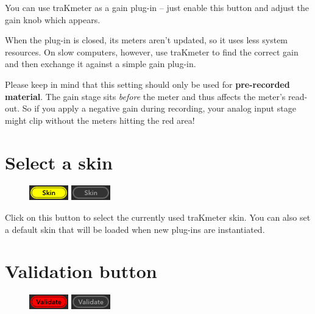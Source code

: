 You can use traKmeter as a gain plug-in -- just enable this button and
adjust the gain knob which appears.

When the plug-in is closed, its meters aren't updated, so it uses less
system resources.  On slow computers, however, use traKmeter to find
the correct gain and then exchange it against a simple gain plug-in.

Please keep in mind that this setting should only be used for
\textbf{pre-recorded material}.  The gain stage sits \emph{before} the
meter and thus affects the meter's read-out.  So if you apply a
negative gain during recording, your analog input stage might clip
without the meters hitting the red area!

\section{Select a skin}

\begin{figure}
\includegraphics[scale=\screenshotscale,clip]{include/images/button_skin_on.png}
\newline \vspace{-0.9\baselineskip}
\includegraphics[scale=\screenshotscale,clip]{include/images/button_skin_off.png}
\end{figure}

Click on this button to select the currently used traKmeter skin.  You
can also set a default skin that will be loaded when new plug-ins are
instantiated.

\section{Validation button}
\label{sec:validation_button}

\begin{figure}
\includegraphics[scale=\screenshotscale,clip]{include/images/button_validate_on.png}
\newline \vspace{-0.9\baselineskip}
\includegraphics[scale=\screenshotscale,clip]{include/images/button_validate_off.png}
\end{figure}

